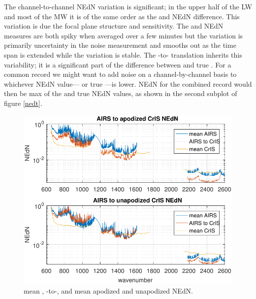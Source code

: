 \documentclass[10pt,twocolumn]{article}  %
\begin{document}
The {\airs} channel-to-channel NEdN variation is significant; in the
upper half of the LW and most of the MW it is of the same order as
the {\airs} and {\cris} NEdN difference.  This variation is due the
{\airs} focal plane structure and sensitivity.  The {\airs} and
{\cris} NEdN measures are both spiky when averaged over a few
minutes but the {\cris} variation is primarily uncertainty in the
noise measurement and smooths out as the time span is extended
while the {\airs} variation is stable.  The {\airs}-to-{\cris}
translation inherits this variability; it is a significant part of
the difference between {\airs} {\cris} and true {\cris}.  For a
common record we might want to add noise on a channel-by-channel
basis to whichever NEdN value---{\airs} {\cris} or true {\cris}---is
lower.  NEdN for the combined record would then be max of the
{\airs} {\cris} and true {\cris} NEdN values, as shown in the second
subplot of figure \ref{nedt}.

\begin{figure} %
  \centering
  \includegraphics[width=\linewidth]{figures/a2cris_nedn.pdf}
  \caption{mean {\airs}, {\airs}-to-{\cris}, and mean {\cris}
    apodized and unapodized NEdN.}
  \label{nedn}
\end{figure}
\end{document}
